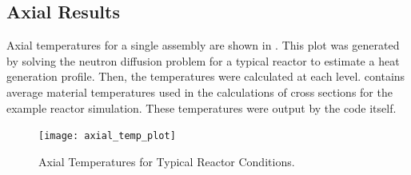   \subsection{Axial Results}
    Axial temperatures for a single assembly are shown in
    . This plot was generated by solving the neutron
    diffusion problem for a typical reactor to estimate a heat generation
    profile. Then, the temperatures were calculated at each level.
     contains average material temperatures used in
    the calculations of cross sections for the example reactor simulation. These
    temperatures were output by the code itself.

    \begin{figure}
      \centering
      \texttt{[image: axial\_temp\_plot]}
      \caption{Axial Temperatures for Typical Reactor Conditions.}
      \label{fig:axial_temp_plot}
    \end{figure}

